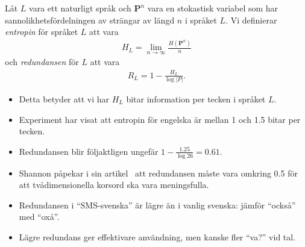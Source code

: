 \documentclass{beamer}
\let\stoch\mathbf{}
\begin{document}
\begin{frame}
  \begin{definition}
    Låt \(L\) vara ett naturligt språk och \(\stoch P^n\) vara en stokastisk 
    variabel som har sannolikhetsfördelningen av strängar av längd \(n\) 
    i språket \(L\).
    Vi definierar \emph{entropin} för språket \(L\) att vara
    \begin{align*}
      H_L = \lim_{n\to \infty}\frac{H(\stoch P^n)}{n}
    \end{align*}
    och \emph{redundansen} för \(L\) att vara
    \begin{align*}
      R_L = 1 - \frac{H_L}{\log |P|}.
    \end{align*}
  \end{definition}
\end{frame}

\begin{frame}
  \begin{itemize}
    \item Detta betyder att vi har \(H_L\) bitar information per tecken 
      i språket \(L\).

    \item Experiment har visat att entropin för engelska är mellan 1 och 1.5 
      bitar per tecken.

    \item Redundansen blir följaktligen ungefär \(1 - \frac{1.25}{\log 26} 
      = 0.61\).

    \item Shannon påpekar i sin artikel~\cite{Shannon1948amt} att redundansen 
      måste vara omkring 0.5 för att tvådimensionella korsord ska vara 
      meningsfulla.

    \item Redundansen i \enquote{SMS-svenska} är lägre än i vanlig svenska: 
      jämför \enquote{också} med \enquote{oxå}.

    \item Lägre redundans ger effektivare användning, men kanske fler 
      \enquote{va?} vid tal.

  \end{itemize}
\end{frame}

%
%
%
\end{document}
